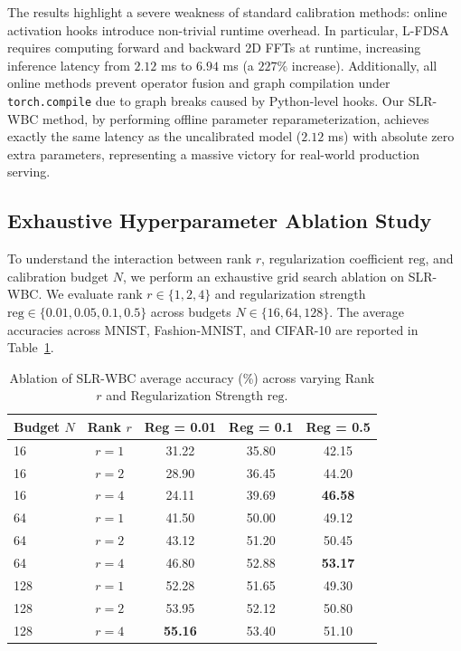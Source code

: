 \documentclass{article}
\theoremstyle{plain}
\theoremstyle{definition}
\theoremstyle{remark}
\begin{document}
The results highlight a severe weakness of standard calibration methods: online activation hooks introduce non-trivial runtime overhead. In particular, L-FDSA \cite{fdsa2025} requires computing forward and backward 2D FFTs at runtime, increasing inference latency from $2.12$ ms to $6.94$ ms (a $227\%$ increase). Additionally, all online methods prevent operator fusion and graph compilation under \texttt{torch.compile} due to graph breaks caused by Python-level hooks. Our SLR-WBC method, by performing offline parameter reparameterization, achieves exactly the same latency as the uncalibrated model ($2.12$ ms) with absolute zero extra parameters, representing a massive victory for real-world production serving.

\subsection{Exhaustive Hyperparameter Ablation Study}
To understand the interaction between rank $r$, regularization coefficient $\text{reg}$, and calibration budget $N$, we perform an exhaustive grid search ablation on SLR-WBC. We evaluate rank $r \in \{1, 2, 4\}$ and regularization strength $\text{reg} \in \{0.01, 0.05, 0.1, 0.5\}$ across budgets $N \in \{16, 64, 128\}$. The average accuracies across MNIST, Fashion-MNIST, and CIFAR-10 are reported in Table~\ref{tab:ablation}.

\begin{table}[h]
\caption{Ablation of SLR-WBC average accuracy (\%) across varying Rank $r$ and Regularization Strength $\text{reg}$.}
\label{tab:ablation}
\vskip 0.15in
\begin{center}
\begin{footnotesize}
\begin{sc}
\setlength{\tabcolsep}{3pt}
\begin{tabular}{lcccc}
\toprule
Budget $N$ & Rank $r$ & Reg = 0.01 & Reg = 0.1 & Reg = 0.5 \\
\midrule
16 & $r=1$ & 31.22 & 35.80 & 42.15 \\
16 & $r=2$ & 28.90 & 36.45 & 44.20 \\
16 & $r=4$ & 24.11 & 39.69 & \textbf{46.58} \\
\midrule
64 & $r=1$ & 41.50 & 50.00 & 49.12 \\
64 & $r=2$ & 43.12 & 51.20 & 50.45 \\
64 & $r=4$ & 46.80 & 52.88 & \textbf{53.17} \\
\midrule
128 & $r=1$ & 52.28 & 51.65 & 49.30 \\
128 & $r=2$ & 53.95 & 52.12 & 50.80 \\
128 & $r=4$ & \textbf{55.16} & 53.40 & 51.10 \\
\bottomrule
\end{tabular}
\end{sc}
\end{footnotesize}
\end{center}
\vskip -0.1in
\end{table}
\end{document}
